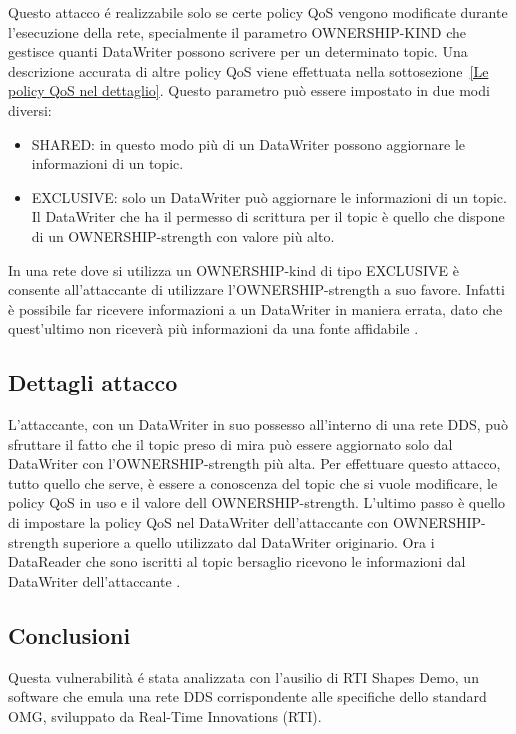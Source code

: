 Questo attacco é realizzabile solo se certe policy QoS vengono
modificate durante l'esecuzione della rete, specialmente il parametro
OWNERSHIP-KIND che gestisce quanti DataWriter possono scrivere per un
determinato topic. Una descrizione accurata di altre policy QoS viene 
effettuata nella sottosezione~\ref{Le policy QoS nel dettaglio}.
Questo parametro può essere impostato in due modi diversi:
\begin{itemize}
    \item SHARED: in questo modo più di un DataWriter possono aggiornare le
    informazioni di un topic.
    \item EXCLUSIVE: solo un DataWriter può aggiornare le informazioni di un
    topic. Il DataWriter che ha il permesso di scrittura per il topic è quello
    che dispone di un OWNERSHIP-strength con valore più alto.
\end{itemize}
In una rete dove si utilizza un OWNERSHIP-kind di tipo EXCLUSIVE è consente
all'attaccante di utilizzare l'OWNERSHIP-strength a suo favore.
Infatti è possibile far ricevere informazioni a un DataWriter
in maniera errata, dato che quest'ultimo non riceverà più informazioni da
una fonte affidabile 
\cite{DBLP:conf/malware/MichaudDL18}.


\subsection{Dettagli attacco}
L'attaccante, con un DataWriter in suo possesso all'interno di una rete DDS,
può sfruttare il fatto che il topic preso di mira può essere aggiornato
solo dal DataWriter con l'OWNERSHIP-strength più alta.
Per effettuare questo attacco, tutto quello che serve, è 
essere a conoscenza del topic che
si vuole modificare, le policy QoS in uso e il valore dell OWNERSHIP-strength.
L'ultimo passo è quello di impostare la policy QoS nel DataWriter
dell'attaccante con OWNERSHIP-strength superiore a quello utilizzato dal
DataWriter originario.
Ora i DataReader che sono iscritti al topic bersaglio
ricevono le informazioni dal DataWriter dell'attaccante
\cite{DBLP:conf/malware/MichaudDL18}.


\subsection{Conclusioni}
Questa vulnerabilità é stata analizzata con l'ausilio di RTI Shapes Demo, un 
software che emula una rete DDS corrispondente alle specifiche 
dello standard OMG, sviluppato da Real-Time Innovations (RTI).

